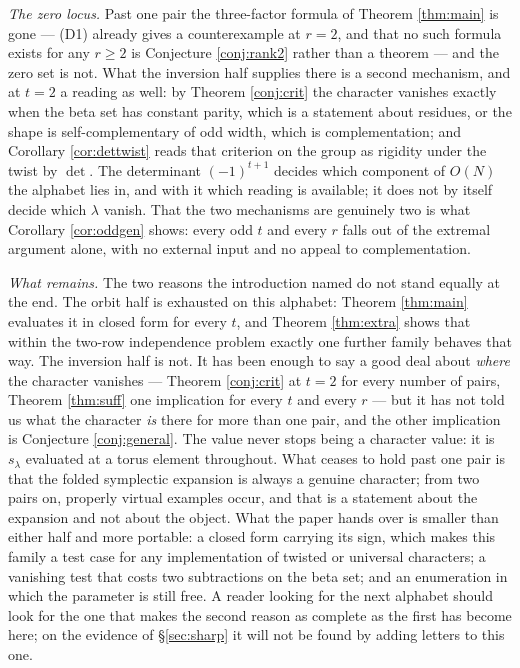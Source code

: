 \documentclass[11pt,reqno]{amsart}
\theoremstyle{plain}
\theoremstyle{definition}
\begin{document}
\emph{The zero locus.} Past one pair the three-factor formula of Theorem \ref{thm:main} is gone ---
(D1) already gives a counterexample at $r=2$, and that no such formula exists for any $r\ge2$ is
Conjecture \ref{conj:rank2} rather than a theorem --- and the zero set is not. What the inversion half supplies there is a second mechanism, and
at $t=2$ a reading as well: by Theorem \ref{conj:crit} the character vanishes exactly when the beta set has
constant parity, which is a statement about residues, or the shape is self-complementary of odd
width, which is complementation; and
Corollary \ref{cor:dettwist} reads that criterion on the group as rigidity under the twist by
$\det$. The determinant $(-1)^{t+1}$ decides which component of $O(N)$ the alphabet lies in, and with
it which reading is available; it does not by itself decide which $\lambda$ vanish. That the two
mechanisms are genuinely two is what Corollary \ref{cor:oddgen} shows: every odd $t$ and every $r$
falls out of the extremal argument alone, with no external input and no appeal to complementation.

\emph{What remains.} The two reasons the introduction named do not stand equally at the end. The
orbit half is exhausted on this alphabet: Theorem \ref{thm:main} evaluates it in closed form for
every $t$, and
Theorem \ref{thm:extra} shows that within the two-row independence problem exactly one further
family behaves that way. The inversion half is not. It has been enough to say a good deal about
\emph{where} the character vanishes --- Theorem \ref{conj:crit} at $t=2$ for every number of pairs,
Theorem \ref{thm:suff} one implication for every $t$ and every $r$ --- but it has not told us what
the character \emph{is} there for more than one pair, and the other implication is Conjecture
\ref{conj:general}. The value never stops being a character value: it is $s_\lambda$ evaluated at a
torus element throughout. What ceases to hold past one pair is that the folded symplectic expansion
is always a genuine character; from two pairs on, properly virtual examples occur, and that is a
statement about the expansion and not about the object. What the paper hands over is smaller than
either half and more portable: a closed form carrying its sign, which makes this family a test case
for any implementation of twisted or universal characters; a vanishing test that costs two
subtractions on the beta set; and an enumeration in which the parameter is still free. A reader
looking for the next alphabet should look for the one that makes the second reason as complete as the
first has become here; on the evidence of \S\ref{sec:sharp} it will not be found by adding letters
to this one.
\end{document}

